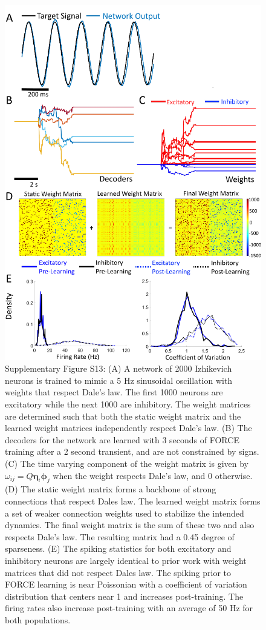 \documentclass[11pt]{article} %
\begin{document}
\clearpage
\begin{figure}[htp!]
\centering
\includegraphics[scale=0.74]{FFIGS11}
\caption*{Supplementary Figure S13:  (A) A network of 2000 Izhikevich neurons is trained to mimic a 5 Hz sinusoidal oscillation with weights that respect Dale's law.  The first 1000 neurons are excitatory while the next 1000 are inhibitory.  The weight matrices are determined such that both the static weight matrix and the learned weight matrices independently respect Dale's law.  (B) The decoders for the network are learned with 3 seconds of FORCE training after a 2 second transient, and are not constrained by signs.  (C) The time varying component of the weight matrix is given by $\omega_{ij} =Q \bm \eta_i \bm \phi_j$ when the weight respects Dale's law, and 0 otherwise.  (D) The static weight matrix forms a backbone of strong connections that respect Dales law.  The learned weight matrix forms a set of weaker connection weights used to stabilize the intended dynamics.  The final weight matrix is the sum of these two and also respects Dale's law.   The resulting matrix had a 0.45 degree of sparseness.   (E) The spiking statistics for both excitatory and inhibitory neurons are largely identical to prior work with weight matrices that did not respect Dales law.  The spiking prior to FORCE learning is near Poissonian with a coefficient of variation distribution that centers near 1 and increases post-training.  The firing rates also increase post-training with an average of 50 Hz for both populations.}
\end{figure}
\end{document}

